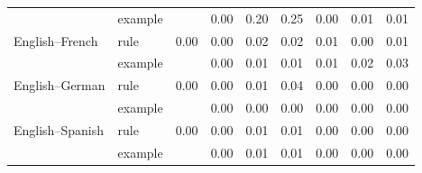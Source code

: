 \begin{tabular}{@{}llccccccc@{}}
 & example &  & 0.00 & 0.20 & 0.25 & 0.00 & 0.01 & 0.01 \\
English--French & rule & 0.00 & 0.00 & 0.02 & 0.02 & 0.01 & 0.00 & 0.01 \\
 & example &  & 0.00 & 0.01 & 0.01 & 0.01 & 0.02 & 0.03 \\
English--German & rule & 0.00 & 0.00 & 0.01 & 0.04 & 0.00 & 0.00 & 0.00 \\
 & example &  & 0.00 & 0.00 & 0.00 & 0.00 & 0.00 & 0.00 \\
English--Spanish & rule & 0.00 & 0.00 & 0.01 & 0.01 & 0.00 & 0.00 & 0.00 \\
 & example &  & 0.00 & 0.01 & 0.01 & 0.00 & 0.00 & 0.00 \\
\bottomrule
\end{tabular}
